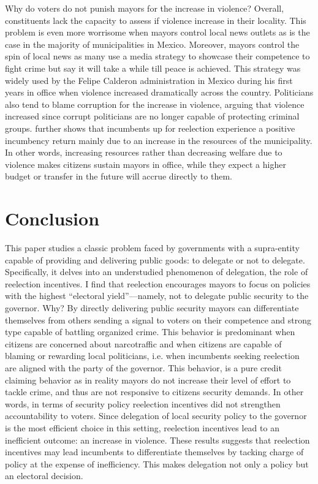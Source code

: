 Why do voters do not punish mayors for the increase in violence? Overall, constituents lack the capacity to assess if violence increase in their locality. This problem is even more worrisome when mayors control local news outlets as is the case in the majority of municipalities in Mexico. Moreover, mayors control the spin of local news as many use a media strategy to showcase their competence to fight crime but say it will take a while till peace is achieved. This strategy was widely used by the Felipe Calderon administration in Mexico during his first years in office when violence increased dramatically across the country. Politicians also tend to blame corruption for the increase in violence, arguing that violence increased since corrupt politicians are no longer capable of protecting criminal groups. \citet{ch_2021} further shows that incumbents up for reelection experience a positive incumbency return mainly due to an increase in the resources of the municipality. In other words, increasing resources rather than decreasing welfare due to violence makes citizens sustain mayors in office, while they expect a higher budget or transfer in the future will accrue directly to them. 

\section{Conclusion \label{sec:conclusion}}

This paper studies a classic problem faced by governments with a supra-entity capable of providing and delivering public goods: to delegate or not to delegate. Specifically, it delves into an understudied phenomenon of delegation, the role of reelection incentives. I find that reelection encourages mayors to focus on policies with the highest “electoral yield”—namely, not to delegate public security to the governor. Why? By directly delivering public security mayors can differentiate themselves from others sending a signal to voters on their competence and strong type capable of battling organized crime. This behavior is predominant when citizens are concerned about narcotraffic and when citizens are capable of blaming or rewarding local politicians, i.e. when incumbents seeking reelection are aligned with the party of the governor. This behavior, is a pure credit claiming behavior as in reality mayors do not increase their level of effort to tackle crime, and thus are not responsive to citizens security demands. In other words, in terms of security policy reelection incentives did not strengthen accountability to voters. Since delegation of local security policy to the governor is the most efficient choice in this setting, reelection incentives lead to an inefficient outcome: an increase in violence. These results suggests that reelection incentives may lead incumbents to differentiate themselves by tacking charge of policy at the expense of inefficiency. This makes delegation not only a policy but an electoral decision. 

